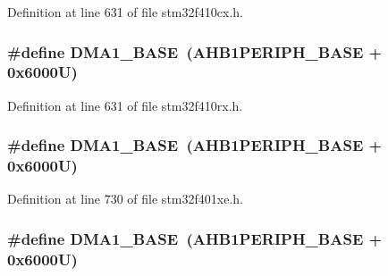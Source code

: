 Definition at line 631 of file stm32f410cx.\+h.

\subsubsection[{\texorpdfstring{D\+M\+A1\+\_\+\+B\+A\+SE}{DMA1_BASE}}]{\setlength{\rightskip}{0pt plus 5cm}\#define D\+M\+A1\+\_\+\+B\+A\+SE~({\bf A\+H\+B1\+P\+E\+R\+I\+P\+H\+\_\+\+B\+A\+SE} + 0x6000\+U)}\hypertarget{group___peripheral__registers__structures_gab2d8a917a0e4ea99a22ac6ebf279bc72}{}\label{group___peripheral__registers__structures_gab2d8a917a0e4ea99a22ac6ebf279bc72}


Definition at line 631 of file stm32f410rx.\+h.

\subsubsection[{\texorpdfstring{D\+M\+A1\+\_\+\+B\+A\+SE}{DMA1_BASE}}]{\setlength{\rightskip}{0pt plus 5cm}\#define D\+M\+A1\+\_\+\+B\+A\+SE~({\bf A\+H\+B1\+P\+E\+R\+I\+P\+H\+\_\+\+B\+A\+SE} + 0x6000\+U)}\hypertarget{group___peripheral__registers__structures_gab2d8a917a0e4ea99a22ac6ebf279bc72}{}\label{group___peripheral__registers__structures_gab2d8a917a0e4ea99a22ac6ebf279bc72}


Definition at line 730 of file stm32f401xe.\+h.

\subsubsection[{\texorpdfstring{D\+M\+A1\+\_\+\+B\+A\+SE}{DMA1_BASE}}]{\setlength{\rightskip}{0pt plus 5cm}\#define D\+M\+A1\+\_\+\+B\+A\+SE~({\bf A\+H\+B1\+P\+E\+R\+I\+P\+H\+\_\+\+B\+A\+SE} + 0x6000\+U)}\hypertarget{group___peripheral__registers__structures_gab2d8a917a0e4ea99a22ac6ebf279bc72}{}\label{group___peripheral__registers__structures_gab2d8a917a0e4ea99a22ac6ebf279bc72}


